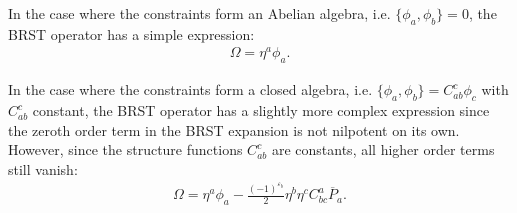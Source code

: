     \begin{example}
        In the case where the constraints form an Abelian algebra, i.e. $\{\phi_a,\phi_b\}=0$, the BRST operator has a simple expression:
        \begin{gather}
            \Omega = \eta^a\phi_a.
        \end{gather}
    \end{example}
    \begin{example}
        In the case where the constraints form a closed algebra, i.e. $\{\phi_a,\phi_b\}=C^c_{ab}\phi_c$ with $C^c_{ab}$ constant, the BRST operator has a slightly more complex expression since the zeroth order term in the BRST expansion is not nilpotent on its own. However, since the structure functions $C^c_{ab}$ are constants, all higher order terms still vanish:
        \begin{gather}
            \Omega = \eta^a\phi_a -\frac{(-1)^{\varepsilon_b}}{2}\eta^b\eta^c C^a_{bc}\overline{P}_a.
        \end{gather}
    \end{example}
